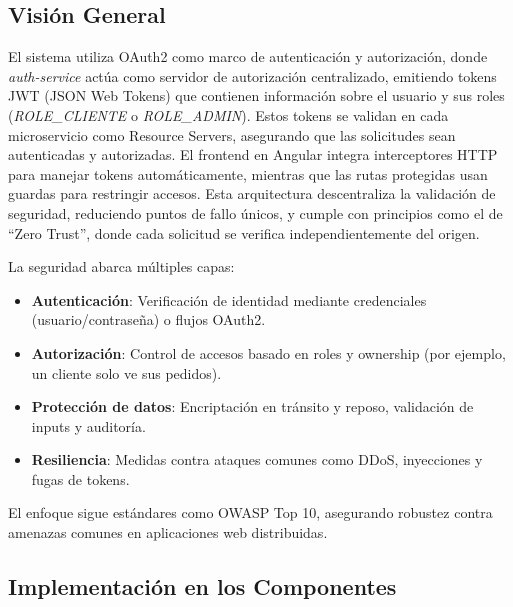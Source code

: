 \documentclass[a4paper,12pt]{article}
\begin{document}
\subsection{Visión General}
El sistema utiliza OAuth2 como marco de autenticación y autorización, donde \textit{auth-service} actúa como servidor de autorización centralizado, emitiendo tokens JWT (JSON Web Tokens) que contienen información sobre el usuario y sus roles (\textit{ROLE_CLIENTE} o \textit{ROLE_ADMIN}). Estos tokens se validan en cada microservicio como Resource Servers, asegurando que las solicitudes sean autenticadas y autorizadas. El frontend en Angular integra interceptores HTTP para manejar tokens automáticamente, mientras que las rutas protegidas usan guardas para restringir accesos. Esta arquitectura descentraliza la validación de seguridad, reduciendo puntos de fallo únicos, y cumple con principios como el de ``Zero Trust'', donde cada solicitud se verifica independientemente del origen.

La seguridad abarca múltiples capas:
\begin{itemize}
    \item \textbf{Autenticación}: Verificación de identidad mediante credenciales (usuario/contraseña) o flujos OAuth2.
    \item \textbf{Autorización}: Control de accesos basado en roles y ownership (por ejemplo, un cliente solo ve sus pedidos).
    \item \textbf{Protección de datos}: Encriptación en tránsito y reposo, validación de inputs y auditoría.
    \item \textbf{Resiliencia}: Medidas contra ataques comunes como DDoS, inyecciones y fugas de tokens.
\end{itemize}

El enfoque sigue estándares como OWASP Top 10, asegurando robustez contra amenazas comunes en aplicaciones web distribuidas.

\subsection{Implementación en los Componentes}
\end{document}
